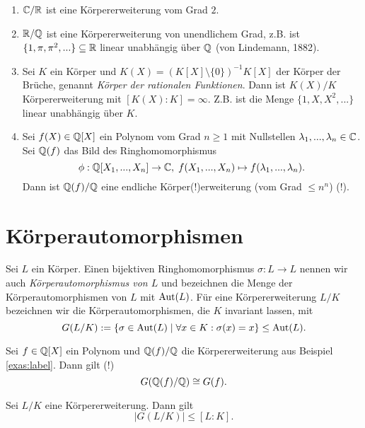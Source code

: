 \documentclass{book}
\begin{document}
\begin{exas}
    \label{exas:label}
    \begin{enumerate}
        \item $\mathbb{C}/\mathbb{R}$ ist eine Körpererweiterung vom Grad $2$.
        \item $\mathbb{R}/\mathbb{Q}$ ist eine Körpererweiterung von unendlichem Grad, z.B.
            ist $\{1,\pi, \pi^2, ... \} \subseteq \mathbb{R}$ linear unabhängig über
            $\mathbb{Q}$ (von Lindemann, 1882).
        \item Sei $K$ ein Körper und $K(X) = (K[X] \setminus \{0\})^{-1} K[X]$
            der Körper der Brüche, genannt \emph{Körper der rationalen Funktionen}.
            Dann ist $K(X)/K$ Körpererweiterung mit $[K(X):K] = \infty$. Z.B.
            ist die Menge $\{1,X,X^2, ... \}$ linear unabhängig über $K$. 
        \item Sei $f(X) \in \mathbb{Q}[X]$ ein Polynom vom Grad $n \ge 1$ mit
            Nullstellen $\lambda_1, ..., \lambda_n \in \mathbb{C}$. Sei $\mathbb{Q}(f)$ das Bild
            des Ringhomomorphismus
            \[
                \phi: \QQ[X_1, ..., X_n] \to \CC,\; f(X_1, ..., X_n) \mapsto f(\lambda_1, ..., \lambda_n).
            \]
            Dann ist $\mathbb{Q}(f)/\mathbb{Q}$ eine endliche
            Körper(!)erweiterung (vom Grad $\le n^n$) (!).
    \end{enumerate}
\end{exas}

\section{Körperautomorphismen}%
\label{sec:korperautomorphismen}

Sei $L$ ein Körper. Einen bijektiven Ringhomomorphismus $\sigma: L \to L$
nennen wir auch \emph{Körperautomorphismus von $L$} und bezeichnen die Menge
der Körperautomorphismen von $L$ mit $\operatorname{Aut}(L)$. Für eine Körpererweiterung
$L/K$ bezeichnen wir die Körperautomorphismen, die $K$ invariant lassen, mit
\[
    G(L/K) := \{ \sigma \in \operatorname{Aut}(L)\; |\; \forall x \in K: \sigma(x) = x \} \le
    \operatorname{Aut}(L).
\]

\begin{exa}
    \label{exa:galois}
    Sei $f \in \mathbb{Q}[X]$ ein Polynom und $\mathbb{Q}(f)/\mathbb{Q}$ die Körpererweiterung aus
    Beispiel \ref{exas:label}. Dann gilt (!)
    \[
        G(\mathbb{Q}(f)/\mathbb{Q}) \cong G(f).
    \]
\end{exa}

\begin{thm}
    \label{thm:galoisbound}
    Sei $L/K$ eine Körpererweiterung. Dann gilt
    \[
        | G(L/K) | \le [L:K].
    \]
\end{thm}
\end{document}
